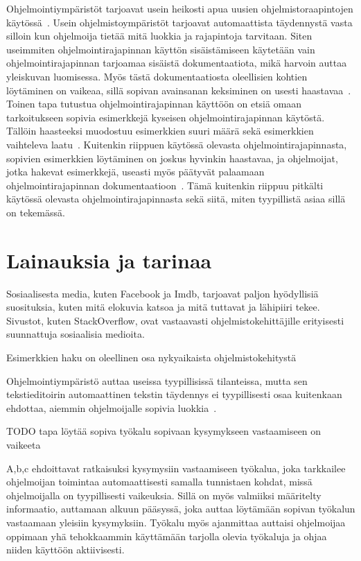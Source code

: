 \documentclass[finnish]{../tktltiki2}
\theoremstyle{definition}
\theoremstyle{remark}
\begin{document}
Ohjelmointiympäristöt tarjoavat usein heikosti apua uusien ohjelmistoraapintojen käytössä~\cite{jungloid-mining}. Usein ohjelmistoympäristöt tarjoavat automaattista täydennystä vasta silloin kun ohjelmoija tietää mitä luokkia ja rajapintoja tarvitaan. Siten useimmiten ohjelmointirajapinnan käyttön sisäistämiseen käytetään vain ohjelmointirajapinnan tarjoamaa sisäistä dokumentaatiota, mikä harvoin auttaa yleiskuvan luomisessa. Myös tästä dokumentaatiosta oleellisien kohtien löytäminen on vaikeaa, sillä sopivan avainsanan keksiminen on usesti haastavaa~\cite{what-to-search-for}.
Toinen tapa tutustua ohjelmointirajapinnan käyttöön on etsiä omaan tarkoitukseen sopivia esimerkkejä kyseisen ohjelmointirajapinnan käytöstä. Tällöin haasteeksi muodostuu esimerkkien suuri määrä sekä esimerkkien vaihteleva laatu~\cite{example-overflow-social-media-for-code-recommendations}. Kuitenkin riippuen käytössä olevasta ohjelmointirajapinnasta, sopivien esimerkkien löytäminen on joskus hyvinkin haastavaa, ja ohjelmoijat, jotka hakevat esimerkkejä, useasti myös päätyvät palaamaan ohjelmointirajapinnan dokumentaatioon~\cite{asking-and-answering-api-questions}. Tämä kuitenkin riippuu pitkälti käytössä olevasta ohjelmointirajapinnasta sekä siitä, miten tyypillistä asiaa sillä on tekemässä.

\section{Lainauksia ja tarinaa}
Sosiaalisesta media, kuten Facebook ja Imdb, tarjoavat paljon hyödyllisiä suosituksia, kuten mitä elokuvia katsoa ja mitä tuttavat ja lähipiiri tekee. Sivustot, kuten StackOverflow, ovat vastaavasti ohjelmistokehittäjille erityisesti suunnattuja sosiaalisia medioita.


Esimerkkien haku on oleellinen osa nykyaikaista ohjelmistokehitystä \cite{example-overflow-social-media-for-code-recommendations}

Ohjelmointiympäristö auttaa useissa tyypillisissä tilanteissa, mutta sen tekstieditoirin automaattinen tekstin täydennys ei tyypillisesti osaa kuitenkaan ehdottaa, aiemmin ohjelmoijalle sopivia luokkia~\cite{jungloid-mining}.

TODO tapa löytää sopiva työkalu sopivaan kysymykseen vastaamiseen on vaikeeta \cite{programmers-coach}

A,b,c ehdoittavat ratkaisuksi kysymysiin vastaamiseen työkalua, joka tarkkailee ohjelmoijan toimintaa automaattisesti samalla tunnistaen kohdat, missä ohjelmoijalla on tyypillisesti vaikeuksia. Sillä on myös valmiiksi määritelty informaatio, auttamaan alkuun pääsyssä, joka auttaa löytämään sopivan työkalun vastaamaan yleisiin kysymyksiin. Työkalu myös ajanmittaa auttaisi ohjelmoijaa oppimaan yhä tehokkaammin käyttämään tarjolla olevia työkaluja ja ohjaa niiden käyttöön aktiivisesti.
\cite{programmers-coach}
\end{document}
